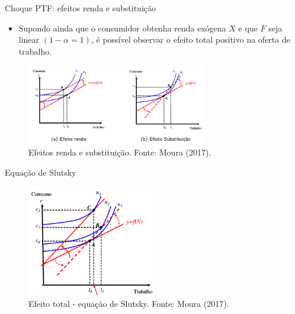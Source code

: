 \documentclass[10pt]{beamer}
\begin{document}
\begin{frame}{Choque PTF: efeitos renda e substituição}
    \begin{itemize}
        \item Supondo ainda que o consumidor obtenha renda exógena $X$ e que $F$ seja linear $(1-\alpha = 1)$, é possível observar o efeito total positivo na oferta de trabalho.
    \end{itemize}
    \begin{figure}
        \centering
        \includegraphics[width=0.7\textwidth]{./figures/aula14_fig13.PNG}
        \caption{Efeitos renda e substituição. Fonte: Moura (2017).}
        \label{fig13}
    \end{figure}
\end{frame}

\begin{frame}{Equação de Slutsky}
    \begin{figure}
        \centering
        \includegraphics[width=0.5\textwidth]{./figures/aula14_fig14.PNG}
        \caption{Efeito total - equação de Slutsky. Fonte: Moura (2017).}
        \label{fig14}
    \end{figure}
\end{frame}
\end{document}
